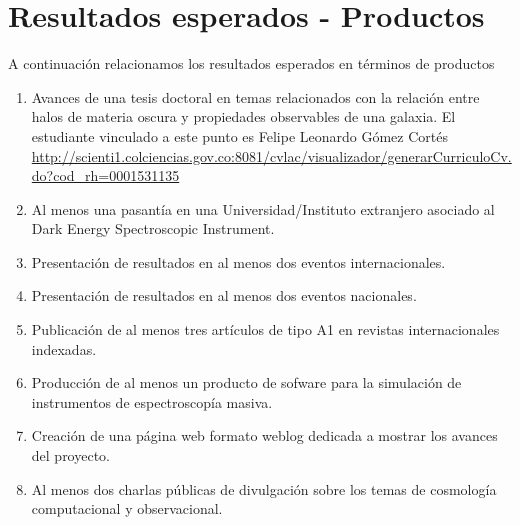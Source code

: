 
\section{Resultados esperados - Productos}


A continuaci\'on relacionamos los resultados esperados en términos de productos 

\begin{enumerate}

\item Avances de una tesis doctoral en temas relacionados con
  la relaci\'on entre halos de materia oscura y propiedades
  observables de una galaxia. 
El estudiante vinculado a este punto 
  es Felipe Leonardo G\'omez Cort\'es
  \url{http://scienti1.colciencias.gov.co:8081/cvlac/visualizador/generarCurriculoCv.do?cod_rh=0001531135}  

\item Al menos una pasant\'ia en una Universidad/Instituto extranjero
  asociado al  Dark Energy Spectroscopic Instrument.

\item Presentaci\'on de resultados en al menos dos eventos
  internacionales.  

\item Presentaci\'on de resultados en al menos dos eventos nacionales.

\item Publicaci\'on de al menos tres art\'iculos de tipo A1 en revistas
  internacionales indexadas. 

\item Producci\'on de al menos un producto de sofware para la
  simulaci\'on de instrumentos de espectroscop\'ia masiva.  

\item Creaci\'on de una p\'agina web formato weblog dedicada a mostrar
  los avances del proyecto. 

\item Al menos dos charlas p\'ublicas de divulgaci\'on sobre los temas
  de cosmolog\'ia computacional y observacional. 

\end{enumerate}
